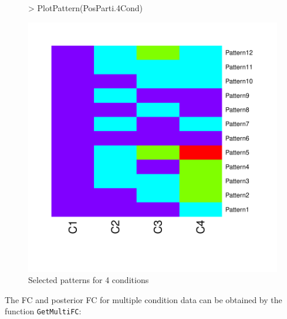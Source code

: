 \documentclass{article}
\begin{document}
\begin{figure}[h!]
\centering
\begin{Schunk}
\begin{Sinput}
> PlotPattern(PosParti.4Cond)
\end{Sinput}
\end{Schunk}
\includegraphics{EBSeq_Vignette-045}
\caption{Selected patterns for 4 conditions}
\label{fig:Patterns4Cond}
\end{figure}
\newpage


The FC and posterior FC for multiple condition data can be obtained by the function \verb+GetMultiFC+:
\end{document}
